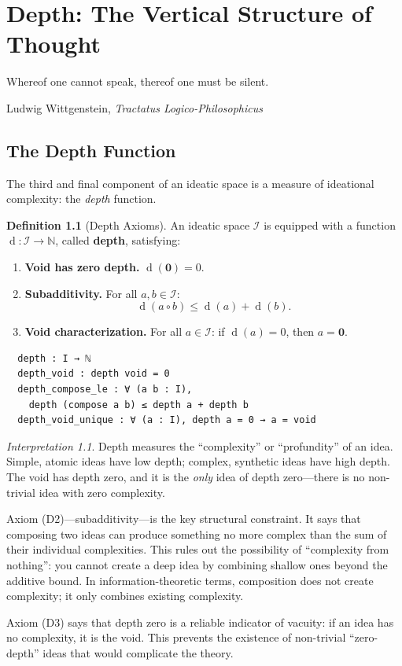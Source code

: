 \documentclass[11pt,openany]{book}
\theoremstyle{definition}
\newtheorem{definition}[axiom]{Definition}
\theoremstyle{plain}
\theoremstyle{remark}
\newtheorem{interpretation}[axiom]{Interpretation}
\newcommand{\IS}{\mathcal{I}}               %
\newcommand{\compose}{\circ}                 %
\newcommand{\void}{\mathbf{0}}              %
\newcommand{\depth}{\operatorname{d}}       %
\begin{document}
\chapter{Depth: The Vertical Structure of Thought}
\label{ch:depth}

\epigraph{Whereof one cannot speak, thereof one must be silent.}{Ludwig Wittgenstein, \textit{Tractatus Logico-Philosophicus}}

\section{The Depth Function}

The third and final component of an ideatic space is a measure of ideational complexity: the \emph{depth} function.

\begin{definition}[Depth Axioms]
\label{def:depth}
An ideatic space $\IS$ is equipped with a function $\depth : \IS \to \mathbb{N}$, called \textbf{depth}, satisfying:
\begin{enumerate}
\item[\textbf{(D1)}] \textbf{Void has zero depth.} $\depth(\void) = 0$.
\item[\textbf{(D2)}] \textbf{Subadditivity.} For all $a, b \in \IS$:
\[ \depth(a \compose b) \leq \depth(a) + \depth(b). \]
\item[\textbf{(D3)}] \textbf{Void characterization.} For all $a \in \IS$: if $\depth(a) = 0$, then $a = \void$.
\end{enumerate}
\end{definition}

\begin{lstlisting}
  depth : I → ℕ
  depth_void : depth void = 0
  depth_compose_le : ∀ (a b : I), 
    depth (compose a b) ≤ depth a + depth b
  depth_void_unique : ∀ (a : I), depth a = 0 → a = void
\end{lstlisting}

\begin{interpretation}
Depth measures the ``complexity'' or ``profundity'' of an idea. Simple, atomic ideas have low depth; complex, synthetic ideas have high depth. The void has depth zero, and it is the \emph{only} idea of depth zero---there is no non-trivial idea with zero complexity.

Axiom (D2)---subadditivity---is the key structural constraint. It says that composing two ideas can produce something no more complex than the sum of their individual complexities. This rules out the possibility of ``complexity from nothing'': you cannot create a deep idea by combining shallow ones beyond the additive bound. In information-theoretic terms, composition does not create complexity; it only combines existing complexity.

Axiom (D3) says that depth zero is a reliable indicator of vacuity: if an idea has no complexity, it is the void. This prevents the existence of non-trivial ``zero-depth'' ideas that would complicate the theory.
\end{interpretation}
\end{document}
